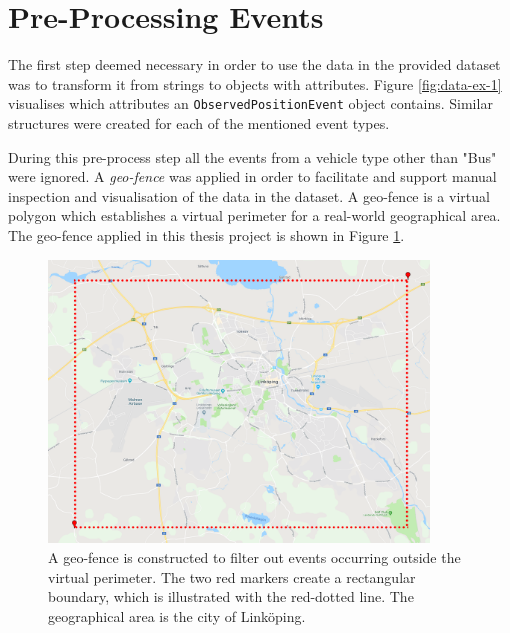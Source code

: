 \section{Pre-Processing Events} \label{sec:pre-process-events}
The first step deemed necessary in order to use the data in the provided dataset was to transform it from strings to objects with attributes.
Figure \ref{fig:data-ex-1} visualises which attributes an \texttt{ObservedPositionEvent} object contains.
Similar structures were created for each of the mentioned event types.

During this pre-process step all the events from a vehicle type other than "Bus" were ignored.
A \textit{geo-fence} was applied in order to facilitate and support manual inspection and visualisation of the data in the dataset.
A geo-fence is a virtual polygon which establishes a virtual perimeter for a real-world geographical area.
The geo-fence applied in this thesis project is shown in Figure \ref{fig:geo-fence}.

\begin{figure}[ht!]
    \centering
    \includegraphics[width=0.9\textwidth]{figures/geofencing_linkoping}
    \caption[A geo-fence is constructed to filter out events occurring outside the virtual perimeter]
    {\small A geo-fence is constructed to filter out events occurring outside the virtual perimeter.
    The two red markers create a rectangular boundary, which is illustrated with the red-dotted line.
    The geographical area is the city of Linköping.}
    \label{fig:geo-fence}
\end{figure}

